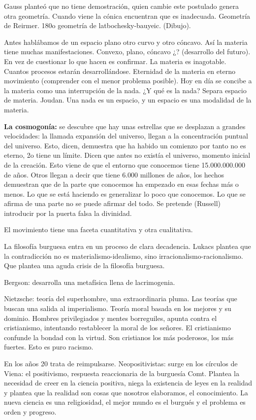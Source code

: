 \documentclass[
  a4paper,
]{article}
\begin{document}
Gauss planteó que no tiene demostración, quien cambie este postulado
genera otra geometría. Cuando viene la cónica encuentran que es
inadecuada. Geometría de Reirmer. 180o geometría de latbochesky-bauyeic.
(Dibujo).

Antes hablábamos de un espacio plano otro curvo y otro cóncavo. Así la
materia tiene muchas manifestaciones. Convexo, plano, cóncavo ¿?
(desarrollo del futuro). En vez de cuestionar lo que hacen es confirmar.
La materia es inagotable. Cuantos procesos estarán desarrollándose.
Eternidad de la materia en eterno movimiento (comprender con el menor
problema posible). Hoy en día se concibe a la materia como una
interrupción de la nada. ¿Y qué es la nada? Separa espacio de materia.
Joudan. Una nada es un espacio, y un espacio es una modalidad de la
materia.

\textbf{La cosmogonía:} se descubre que hay unas estrellas que se
desplazan a grandes velocidades: la llamada expansión del universo,
llegan a la concentración puntual del universo. Esto, dicen, demuestra
que ha habido un comienzo por tanto no es eterno, 2o tiene un límite.
Dicen que antes no existía el universo, momento inicial de la creación.
Esto viene de que el entorno que conocemos tiene 15.000.000.000 de años.
Otros llegan a decir que tiene 6.000 millones de años, los hechos
demuestran que de la parte que conocemos ha empezado en esas fechas más
o menos. Lo que se está haciendo es generalizar lo poco que conocemos.
Lo que se afirma de una parte no se puede afirmar del todo. Se pretende
(Russell) introducir por la puerta falsa la divinidad.

El movimiento tiene una faceta cuantitativa y otra cualitativa.

La filosofía burguesa entra en un proceso de clara decadencia. Lukacs
plantea que la contradicción no es materialismo-idealismo, sino
irracionalismo-racionalismo. Que plantea una aguda crisis de la
filosofía burguesa.

Bergson: desarrolla una metafísica llena de lacrimogenia.

Nietzsche: teoría del superhombre, una extraordinaria pluma. Las teorías
que buscan una salida al imperialismo. Teoría moral basada en los
mejores y su dominio. Hombres privilegiados y mentes borreguiles, apunta
contra el cristianismo, intentando restablecer la moral de los señores.
El cristianismo confunde la bondad con la virtud. Son cristianos los más
poderosos, los más fuertes. Esto es puro racismo.

En los años 20 trata de reimpulsarse. Neopositivistas: surge en los
círculos de Viena: el positivismo, respuesta reaccionaria de la
burguesía Comt. Plantea la necesidad de creer en la ciencia positiva,
niega la existencia de leyes en la realidad y plantea que la realidad
son cosas que nosotros elaboramos, el conocimiento. La nueva ciencia es
una religiosidad, el mejor mundo es el burgués y el problema es orden y
progreso.
\end{document}
